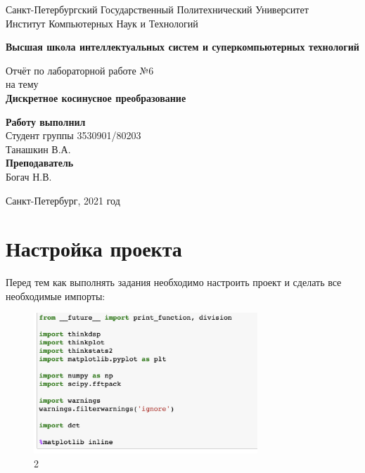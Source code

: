 \documentclass[10pt,a4paper,oneside]{article}
\begin{document}
\begin{titlepage}
\newpage
	\begin{center}
		\Large Санкт-Петербургский Государственный Политехнический Университет\\
		Институт Компьютерных Наук и Технологий\\
	\end{center}
	\begin{center}
		\large\textbf {Высшая школа интеллектуальных систем и суперкомпьютерных технологий}
	\end{center}
	
	\vspace{5em}
	\begin{center}
		\large{Отчёт по лабораторной работе №6 \\ на тему \\
		\textbf{Дискретное косинусное преобразование} }
	\end{center}
	
	\vspace{25em}
	\begin{flushright}
		\textbf{Работу выполнил\\}Студент группы 3530901/80203 \\ Танашкин В.А.\\
		\textbf{Преподаватель\\}Богач Н.В. 
	\end{flushright}
	
	\vspace{\fill}%
	\begin{center}
	Санкт-Петербург, 2021 год	
	\end{center}
\end{titlepage} %

\section{Настройка проекта}
Перед тем как выполнять задания необходимо настроить проект и сделать все необходимые импорты:

\begin{figure}[H]
        \centering
        \includegraphics[width=0.75\textwidth]{pics/0.png}
        \caption{2}
        \label{fig:first}
\end{figure}
\end{document}
